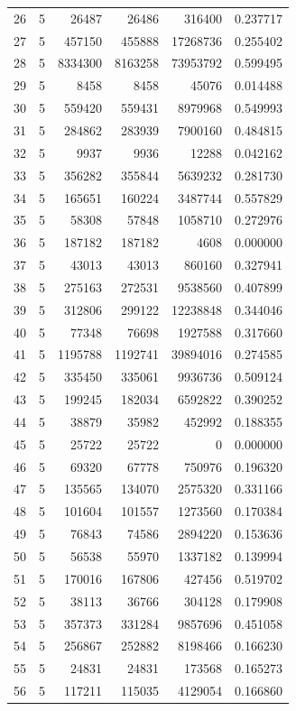 \begin{longtable}{rrrrrr}
26 & 5 & 26487 & 26486 & 316400 & 0.237717\\
27 & 5 & 457150 & 455888 & 17268736 & 0.255402\\
28 & 5 & 8334300 & 8163258 & 73953792 & 0.599495\\
29 & 5 & 8458 & 8458 & 45076 & 0.014488\\
30 & 5 & 559420 & 559431 & 8979968 & 0.549993\\
31 & 5 & 284862 & 283939 & 7900160 & 0.484815\\
32 & 5 & 9937 & 9936 & 12288 & 0.042162\\
33 & 5 & 356282 & 355844 & 5639232 & 0.281730\\
34 & 5 & 165651 & 160224 & 3487744 & 0.557829\\
35 & 5 & 58308 & 57848 & 1058710 & 0.272976\\
36 & 5 & 187182 & 187182 & 4608 & 0.000000\\
37 & 5 & 43013 & 43013 & 860160 & 0.327941\\
38 & 5 & 275163 & 272531 & 9538560 & 0.407899\\
39 & 5 & 312806 & 299122 & 12238848 & 0.344046\\
40 & 5 & 77348 & 76698 & 1927588 & 0.317660\\
41 & 5 & 1195788 & 1192741 & 39894016 & 0.274585\\
42 & 5 & 335450 & 335061 & 9936736 & 0.509124\\
43 & 5 & 199245 & 182034 & 6592822 & 0.390252\\
44 & 5 & 38879 & 35982 & 452992 & 0.188355\\
45 & 5 & 25722 & 25722 & 0 & 0.000000\\
46 & 5 & 69320 & 67778 & 750976 & 0.196320\\
47 & 5 & 135565 & 134070 & 2575320 & 0.331166\\
48 & 5 & 101604 & 101557 & 1273560 & 0.170384\\
49 & 5 & 76843 & 74586 & 2894220 & 0.153636\\
50 & 5 & 56538 & 55970 & 1337182 & 0.139994\\
51 & 5 & 170016 & 167806 & 427456 & 0.519702\\
52 & 5 & 38113 & 36766 & 304128 & 0.179908\\
53 & 5 & 357373 & 331284 & 9857696 & 0.451058\\
54 & 5 & 256867 & 252882 & 8198466 & 0.166230\\
55 & 5 & 24831 & 24831 & 173568 & 0.165273\\
56 & 5 & 117211 & 115035 & 4129054 & 0.166860\\

\end{longtable}
